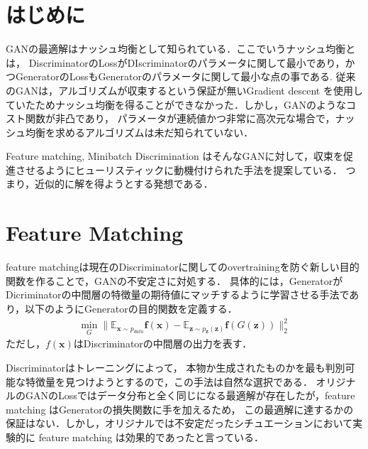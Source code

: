 \documentclass[uplatex, dvipdfmx]{jsarticle}
\theoremstyle{definition}
\begin{document}
    \abovedisplayskip=10.0pt%
    \belowdisplayskip=10.0pt%
    \section{はじめに}
    GANの最適解はナッシュ均衡として知られている．ここでいうナッシュ均衡とは，
    DiscriminatorのLossがDIscriminatorのパラメータに関して最小であり，かつGeneratorのLossもGeneratorのパラメータに関して最小な点の事である.
    従来のGANは，アルゴリズムが収束するという保証が無いGradient descent を使用していたためナッシュ均衡を得ることができなかった．しかし，GANのようなコスト関数が非凸であり，
    パラメータが連続値かつ非常に高次元な場合で，ナッシュ均衡を求めるアルゴリズムは未だ知られていない．

    Feature matching, Minibatch Discrimination はそんなGANに対して，収束を促進させるようにヒューリスティックに動機付けられた手法を提案している．
    つまり，近似的に解を得ようとする発想である．
    \section{Feature Matching}
    feature matchingは現在のDiscriminatorに関してのovertrainingを防ぐ新しい目的関数を作ることで，GANの不安定さに対処する．
    具体的には，GeneratorがDicriminatorの中間層の特徴量の期待値にマッチするように学習させる手法であり，以下のようにGeneratorの目的関数を定義する．
    \begin{align}
        \min_G \| \mathbb{E}_{\bm{x} \sim p_{data}} \bm{f}(\bm{x}) - \mathbb{E}_{\bm{z} \sim p_{\bm{z}}(\bm{z})} \bm{f} (G(\bm{z})) \|_2^2
    \end{align}
    ただし，$f(\bm{x})$はDiscriminatorの中間層の出力を表す．

    Discriminatorはトレーニングによって，
    本物か生成されたものかを最も判別可能な特徴量を見つけようとするので，この手法は自然な選択である．
    オリジナルのGANのLossではデータ分布と全く同じになる最適解が存在したが，feature matching はGeneratorの損失関数に手を加えるため，
    この最適解に達するかの保証はない．しかし，オリジナルでは不安定だったシチュエーションにおいて実験的に feature matching は効果的であったと言っている．
\end{document}
